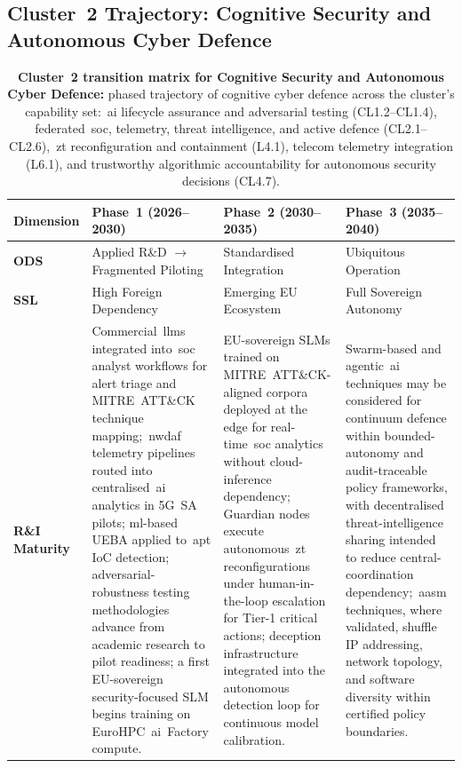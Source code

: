 \documentclass{ieeeaccess}
\begin{document}
\subsection{Cluster~2 Trajectory: Cognitive Security and Autonomous Cyber Defence}
\label{subsec:c2traj}

\begin{table}[t]
\caption{\textbf{Cluster~2 transition matrix for Cognitive Security and Autonomous Cyber Defence:} phased trajectory of cognitive cyber defence across the cluster's capability set:~\gls{ai} lifecycle assurance and adversarial testing (CL1.2--CL1.4), federated~\gls{soc}, telemetry, threat intelligence, and active defence (CL2.1--CL2.6),~\gls{zt} reconfiguration and containment (L4.1), telecom telemetry integration (L6.1), and trustworthy algorithmic accountability for autonomous security decisions (CL4.7).}
\label{tab:c2}
\centering
\footnotesize
\renewcommand{\arraystretch}{1.15}
\begin{tabularx}{\textwidth}{@{}>{\bfseries}p{} X X X@{}}
\toprule
\textbf{Dimension} & \textbf{Phase~1 (2026--2030)} & \textbf{Phase~2 (2030--2035)} & \textbf{Phase~3 (2035--2040)} \\
\midrule
ODS &
Applied R\&D $\rightarrow$ Fragmented Piloting &
Standardised Integration &
Ubiquitous Operation \\
\addlinespace[2pt]
SSL &
High Foreign Dependency &
Emerging EU Ecosystem &
Full Sovereign Autonomy \\
\midrule
R\&I Maturity &
Commercial~\glspl{llm} integrated into~\gls{soc} analyst workflows for alert triage and MITRE~ATT\&CK technique mapping;~\gls{nwdaf} telemetry pipelines routed into centralised~\gls{ai} analytics in 5G~SA pilots; \gls{ml}-based UEBA applied to~\gls{apt} IoC detection; adversarial-robustness testing methodologies advance from academic research to pilot readiness; a first EU-sovereign security-focused SLM begins training on EuroHPC~\gls{ai}~Factory compute. &
EU-sovereign SLMs trained on MITRE~ATT\&CK-aligned corpora deployed at the edge for real-time~\gls{soc} analytics without cloud-inference dependency; Guardian nodes execute autonomous~\gls{zt} reconfigurations under human-in-the-loop escalation for Tier-1 critical actions; deception infrastructure integrated into the autonomous detection loop for continuous model calibration. &
Swarm-based and agentic~\gls{ai} techniques may be considered for continuum defence within bounded-autonomy and audit-traceable policy frameworks, with decentralised threat-intelligence sharing intended to reduce central-coordination dependency;~\gls{aasm} techniques, where validated, shuffle IP addressing, network topology, and software diversity within certified policy boundaries. \\

\end{tabularx}
\end{table}
\end{document}
